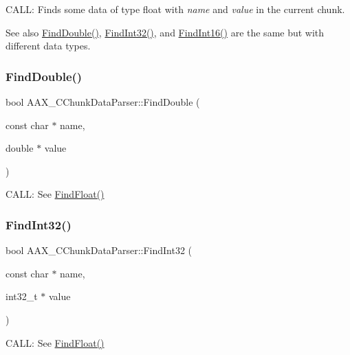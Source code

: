 C\+A\+LL\+: Finds some data of type float with {\itshape name} and {\itshape value} in the current chunk. 

\begin{DoxySeeAlso}{See also}
\mbox{\hyperlink{a01461_ac853da85bf797172a8bc3db5bcf98e66}{Find\+Double()}}, \mbox{\hyperlink{a01461_ad6bbac0856350d4d1734cb7de594149a}{Find\+Int32()}}, and \mbox{\hyperlink{a01461_aaa004cdaafabb16caf7c0bad7e71db8f}{Find\+Int16()}} are the same but with different data types. 
\end{DoxySeeAlso}
\mbox{\label{a01461_ac853da85bf797172a8bc3db5bcf98e66}} 
\subsubsection{\texorpdfstring{FindDouble()}{FindDouble()}}
{\footnotesize\ttfamily bool A\+A\+X\+\_\+\+C\+Chunk\+Data\+Parser\+::\+Find\+Double (\begin{DoxyParamCaption}\item[{const char $\ast$}]{name,  }\item[{double $\ast$}]{value }\end{DoxyParamCaption})}



C\+A\+LL\+: See \mbox{\hyperlink{a01461_a0651792f378318532e5be3799b108e58}{Find\+Float()}} 

\mbox{\label{a01461_ad6bbac0856350d4d1734cb7de594149a}} 
\subsubsection{\texorpdfstring{FindInt32()}{FindInt32()}}
{\footnotesize\ttfamily bool A\+A\+X\+\_\+\+C\+Chunk\+Data\+Parser\+::\+Find\+Int32 (\begin{DoxyParamCaption}\item[{const char $\ast$}]{name,  }\item[{int32\+\_\+t $\ast$}]{value }\end{DoxyParamCaption})}



C\+A\+LL\+: See \mbox{\hyperlink{a01461_a0651792f378318532e5be3799b108e58}{Find\+Float()}} 

